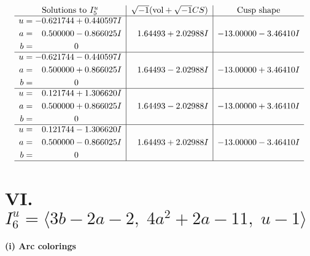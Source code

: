 \documentclass[1p]{elsarticle_modified}
\theoremstyle{definition}
\newcommand{\I}{\sqrt{-1}}
\begin{document}
$$\begin{array}{c|c|c}  
\text{Solutions to }I^u_{5}& \I (\text{vol} + \sqrt{-1}CS) & \text{Cusp shape}\\
 \hline 
\begin{aligned}
u &= -0.621744 + 0.440597 I \\
a &= \phantom{-}0.500000 - 0.866025 I \\
b &= \phantom{-0.000000 } 0\end{aligned}
 & \phantom{-}1.64493 + 2.02988 I & -13.00000 - 3.46410 I \\ \hline\begin{aligned}
u &= -0.621744 - 0.440597 I \\
a &= \phantom{-}0.500000 + 0.866025 I \\
b &= \phantom{-0.000000 } 0\end{aligned}
 & \phantom{-}1.64493 - 2.02988 I & -13.00000 + 3.46410 I \\ \hline\begin{aligned}
u &= \phantom{-}0.121744 + 1.306620 I \\
a &= \phantom{-}0.500000 + 0.866025 I \\
b &= \phantom{-0.000000 } 0\end{aligned}
 & \phantom{-}1.64493 - 2.02988 I & -13.00000 + 3.46410 I \\ \hline\begin{aligned}
u &= \phantom{-}0.121744 - 1.306620 I \\
a &= \phantom{-}0.500000 - 0.866025 I \\
b &= \phantom{-0.000000 } 0\end{aligned}
 & \phantom{-}1.64493 + 2.02988 I & -13.00000 - 3.46410 I\\
 \hline 
 \end{array}$$\newpage\newpage\renewcommand{\arraystretch}{1}
\centering \section*{VI. $I^u_{6}= \langle 3 b-2 a-2,\;4 a^2+2 a-11,\;u-1 \rangle$}
\flushleft \textbf{(i) Arc colorings}\\
\end{document}
